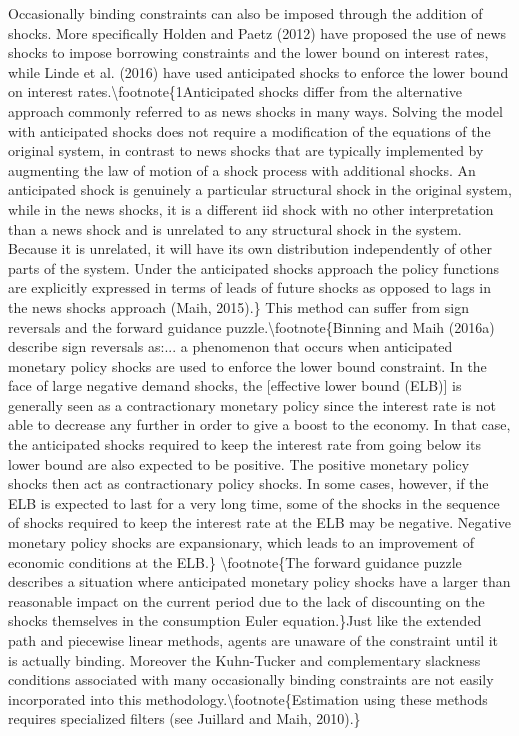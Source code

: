\documentclass[10pt,math=newtx,citestyle=gb7714-2015,bibstyle=gb7714-2015]{elegantbook}
\begin{document}
	Occasionally binding constraints can also be imposed through the addition of shocks. More specifically Holden and Paetz (2012) have proposed the use of news shocks to impose borrowing constraints and the lower bound on interest rates, while Linde et al. (2016) have used anticipated shocks to enforce the lower bound on interest rates.\textbackslash{}footnote\{1Anticipated shocks differ from the alternative approach commonly referred to as news shocks in many ways. Solving the model with anticipated shocks does not require a modification of the equations of the original system, in contrast to news shocks that are typically implemented by augmenting the law of motion of a shock process with additional shocks. An anticipated shock is genuinely a particular structural shock in the original system, while in the news shocks, it is a different iid shock with no other interpretation than a news shock and is unrelated to any structural shock in the system. Because it is unrelated, it will have its own distribution independently of other parts of the system. Under the anticipated shocks approach the policy functions are explicitly expressed in terms of leads of future shocks as opposed to lags in the news shocks approach (Maih, 2015).\} This method can suffer from sign reversals and the forward guidance puzzle.\textbackslash{}footnote\{Binning and Maih (2016a) describe sign reversals as:... a phenomenon that occurs when anticipated monetary policy shocks are used to enforce the lower bound constraint. In the face of large negative demand shocks, the [effective lower bound (ELB)] is generally seen as a contractionary monetary policy since the interest rate is not able to decrease any further in order to give a boost to the economy. In that case, the anticipated shocks required to keep the interest rate from going below its lower bound are also expected to be positive. The positive monetary policy shocks then act as contractionary policy shocks. In some cases, however, if the ELB is expected to last for a very long time, some of the shocks in the sequence of shocks required to keep the interest rate at the ELB may be negative. Negative monetary policy shocks are expansionary, which leads to an improvement of economic conditions at the ELB.\} \textbackslash{}footnote\{The forward guidance puzzle describes a situation where anticipated monetary policy shocks have a larger than reasonable impact on the current period due to the lack of discounting on the shocks themselves in the consumption Euler equation.\}Just like the extended path and piecewise linear methods, agents are unaware of the constraint until it is actually binding. Moreover the Kuhn-Tucker and complementary slackness conditions associated with many occasionally binding constraints are not easily incorporated into this methodology.\textbackslash{}footnote\{Estimation using these methods requires specialized filters (see Juillard and Maih, 2010).\}
	
\end{document}
